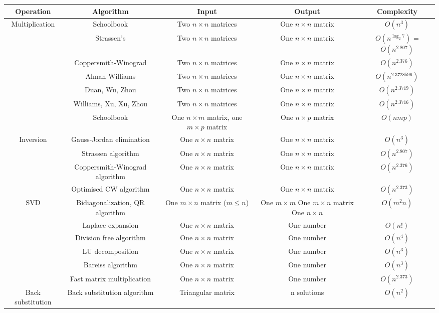 \documentclass{article}
\begin{document}
\begin{table}[ht]
	\centering
	\scriptsize
	\begin{tabular}{c cccc}
		\textbf{Operation} & \textbf{Algorithm} & \textbf{Input} & \textbf{Output} & \textbf{Complexity} \\
		\hline
		Multiplication & Schoolbook & Two $n \times n$ matrices & One $n\times n$ matrix & $O(n^3)$ \\
		 &Strassen's & Two $n \times n$  matrices & One $n\times n$ matrix &$O(n^{\log_2{7}})$ = $O(n^{2.807})$\\
		 &Coppersmith-Winograd & Two $n \times n$  matrices & One $n\times n$ matrix &$O(n^{2.376})$\\
	     &Alman-Williams & Two $n \times n$  matrices & One $n\times n$ matrix& $O(n^{2.3728596})$ \\
	     &Duan, Wu, Zhou & Two $n \times n$  matrices & One $n\times n$ matrix& $O(n^{2.3719})$ \\
	     &Williams, Xu, Xu, Zhou & Two $n \times n$  matrices & One $n\times n$ matrix& $O(n^{2.3716})$ \\
		 &Schoolbook & One $n\times m$ matrix, one $m\times p$ matrix & One $n\times p$ matrix& $O(nmp)$  \\
		\hline
		Inversion &Gauss-Jordan elimination & One $n\times n$ matrix & One $n\times n$ matrix& $O(n^3)$  \\
		 &Strassen algorithm & One $n\times n$ matrix & One $n\times n$ matrix& $O(n^{2.807})$  \\
		 &Coppersmith-Winograd algorithm & One $n\times n$ matrix & One $n\times n$ matrix& $O(n^{2.376})$ \\
		 &Optimised CW algorithm & One $n\times n$ matrix & One $n\times n$ matrix& $O(n^{2.373})$  \\
		 \hline
		SVD &Bidiagonalization, QR algorithm & One $m\times n$ matrix ($m\leq n$)& \makecell {One $m\times m$ \\ One $m \times n$ matrix \\ One $n \times n$} & $O(m^2n)$  \\
		 \hline
		&Laplace expansion & One $n\times n$ matrix & One number & $O(n!)$ \\
		& Division free algorithm & One $n\times n$ matrix & One number & $O(n^4)$ \\
		& LU decomposition & One $n\times n$ matrix & One number & $O(n^3)$ \\
		& Bareiss algorithm & One $n\times n$ matrix & One number & $O(n^3)$ \\
	    & Fast matrix multiplication & One $n\times n$ matrix & One number & $O(n^{2.373})$ \\
		\hline
		Back substitution & Back substitution algorithm & Triangular matrix & n solutions & $O(n^2)$ \\
		\hline
	\end{tabular}
\end{table}
\end{document}
